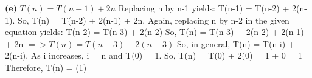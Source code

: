 \documentclass[11pt]{article}
\renewcommand\part[1]{\vspace{.10in}\textbf{(#1)}}
\begin{document}
\part{e} $T(n) = T(n-1)+2n$
\newline Replacing n by n-1 yields: T(n-1) = T(n-2) + 2(n-1).
\newline So, T(n) = T(n-2) + 2(n-1) + 2n. 
\newline Again, replacing n by n-2 in the given equation yields: T(n-2) = T(n-3) + 2(n-2)
\newline So, T(n) = T(n-3) + 2(n-2) + 2(n-1) + 2n
\newline $=> T(n) = T(n-3) + 2(n-3)$
\newline 
\newline So, in general, T(n) = T(n-i) + 2(n-i). 
\newline As i increases, i = n and T(0) = 1. 
\newline So, T(n) = T(0) + 2(0) = 1 + 0 = 1
\newline Therefore, T(n) = \Theta (1)
\end{document}
